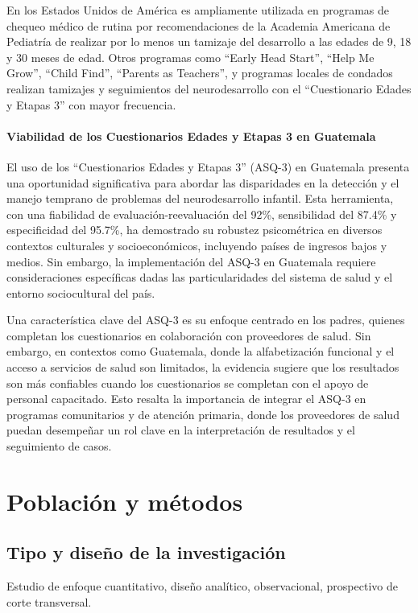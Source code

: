 \documentclass[11pt,letterpaper]{report}
\begin{document}
En los Estados Unidos de América es ampliamente utilizada en programas de
chequeo médico de rutina por recomendaciones de la Academia Americana de
Pediatría de realizar por lo menos un tamizaje del desarrollo a las edades de
9, 18 y 30 meses de edad. Otros programas como ``Early Head Start'', ``Help Me
Grow'', ``Child Find'', ``Parents as Teachers'', y programas locales de
condados realizan tamizajes y seguimientos del neurodesarrollo con el
``Cuestionario Edades y Etapas 3'' con mayor frecuencia. \cite{ASQWorld}

\subsubsection{Viabilidad de los Cuestionarios Edades y Etapas 3 en Guatemala}
El uso de los ``Cuestionarios Edades y Etapas 3'' (ASQ-3) en Guatemala presenta
una oportunidad significativa para abordar las disparidades en la detección y
el manejo temprano de problemas del neurodesarrollo infantil. Esta herramienta,
con una fiabilidad de evaluación-reevaluación del 92\%, sensibilidad del 87.4\%
y especificidad del 95.7\%, ha demostrado su robustez psicométrica en diversos
contextos culturales y socioeconómicos, incluyendo países de ingresos bajos y
medios. Sin embargo, la implementación del ASQ-3 en Guatemala requiere
consideraciones específicas dadas las particularidades del sistema de salud y
el entorno sociocultural del país. \cite{Vameghi2013-uo, Manasyan2023}

Una característica clave del ASQ-3 es su enfoque centrado en los padres,
quienes completan los cuestionarios en colaboración con proveedores de salud.
Sin embargo, en contextos como Guatemala, donde la alfabetización funcional y
el acceso a servicios de salud son limitados, la evidencia sugiere que los
resultados son más confiables cuando los cuestionarios se completan con el
apoyo de personal capacitado. Esto resalta la importancia de integrar el ASQ-3
en programas comunitarios y de atención primaria, donde los proveedores de
salud puedan desempeñar un rol clave en la interpretación de resultados y el
seguimiento de casos. \cite{Manasyan2023, Colbert2021}

	\chapter{Población y métodos}
\section{Tipo y diseño de la investigación}
Estudio de enfoque cuantitativo, diseño analítico, observacional, prospectivo
de corte transversal.
\end{document}
